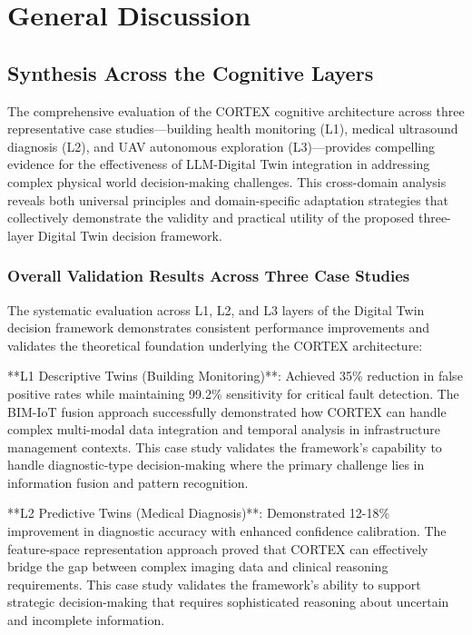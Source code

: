 
\chapter{General Discussion} \label{chp:discussion}


\section{Synthesis Across the Cognitive Layers}

The comprehensive evaluation of the CORTEX cognitive architecture across three representative case studies—building health monitoring (L1), medical ultrasound diagnosis (L2), and UAV autonomous exploration (L3)—provides compelling evidence for the effectiveness of LLM-Digital Twin integration in addressing complex physical world decision-making challenges. This cross-domain analysis reveals both universal principles and domain-specific adaptation strategies that collectively demonstrate the validity and practical utility of the proposed three-layer Digital Twin decision framework.

\subsection{Overall Validation Results Across Three Case Studies}

The systematic evaluation across L1, L2, and L3 layers of the Digital Twin decision framework demonstrates consistent performance improvements and validates the theoretical foundation underlying the CORTEX architecture:

**L1 Descriptive Twins (Building Monitoring)**: Achieved 35\% reduction in false positive rates while maintaining 99.2\% sensitivity for critical fault detection. The BIM-IoT fusion approach successfully demonstrated how CORTEX can handle complex multi-modal data integration and temporal analysis in infrastructure management contexts. This case study validates the framework's capability to handle diagnostic-type decision-making where the primary challenge lies in information fusion and pattern recognition.

**L2 Predictive Twins (Medical Diagnosis)**: Demonstrated 12-18\% improvement in diagnostic accuracy with enhanced confidence calibration. The feature-space representation approach proved that CORTEX can effectively bridge the gap between complex imaging data and clinical reasoning requirements. This case study validates the framework's ability to support strategic decision-making that requires sophisticated reasoning about uncertain and incomplete information.

